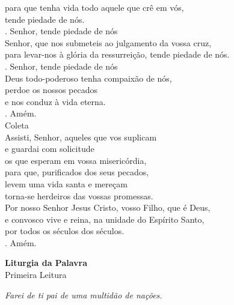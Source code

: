 \documentclass{book}
\begin{document}
\begin{flushleft}
    para que tenha vida todo aquele que crê em vós, \\
    tende piedade de nós. \\
    {\color{VioletRed2} \Rbar.} Senhor, tende piedade de nós
    \vspace{.2cm} \\
    Senhor, que nos submeteis ao julgamento da vossa cruz, \\
    para levar-nos à glória da ressurreição,
    tende piedade de nós. \\
    {\color{VioletRed2} \Rbar.} Senhor, tende piedade de nós
    \vspace{.2cm} \\
    Deus todo-poderoso tenha compaixão de nós, \\
    perdoe os nossos pecados \\
    e nos conduz à vida eterna. \\
    {\color{VioletRed2} \Rbar.} Amém.
    \vspace{.2cm} \\
    \textcolor{VioletRed2}{Coleta}
    \vspace{.2cm} \\
    Assisti, Senhor, aqueles que vos suplicam \\
    e guardai com solicitude \\
    os que esperam em vossa misericórdia, \\
    para que, purificados dos seus pecados, \\
    levem uma vida santa e mereçam  \\
    torna-se herdeiros das vossas promessas. \\
    Por nosso Senhor Jesus Cristo, vosso Filho, que é Deus, \\
    e convosco vive e reina, na unidade do Espírito Santo, \\
    por todos os séculos dos séculos. \\
    {\color{VioletRed2} \Rbar.} Amém. \\
\end{flushleft}
\begin{center}
    \textbf{Liturgia da Palavra}
    \vspace{.2cm}\\
    \textcolor{VioletRed2}{Primeira Leitura}
\end{center}
\begin{flushright}
    \textit{Farei de ti pai de uma multidão de nações.}
\end{flushright}
\end{document}
